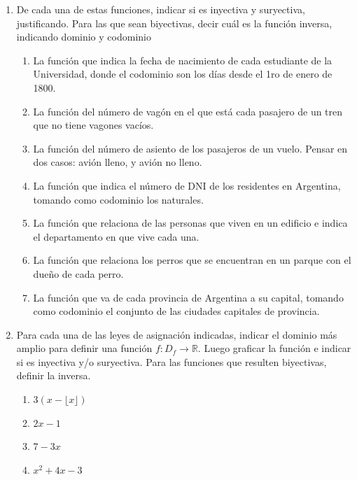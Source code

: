 \documentclass[a4paper]{article}
\newcommand{\exercise}{\item}
\begin{document}
\begin{enumerate}
\begin{enumerate} [label=(\alph*)]
		\item $R = \{(a,b), (b,c), (b,d), (d,e), (e,a)\}$
		\item $R = \{(a,a), (b,a), (c,d), (d,a), (e,a)\}$
		\item $R = \{(a,c), (b,e), (c,a), (d,b), (e,d)\}$
	\end{enumerate}
	\exercise De cada una de estas funciones, indicar si es inyectiva y suryectiva, justificando. Para las que sean biyectivas, decir cuál es la función inversa, indicando dominio y codominio
	\begin{enumerate} [label=(\alph*)]
		\item La función que indica la fecha de nacimiento de cada estudiante de la Universidad, donde el codominio son los días desde el 1ro de enero de 1800.
		\item La función del número de vagón en el que está cada pasajero de un tren que no tiene vagones vacíos.
		\item La función del número de asiento de los pasajeros de un vuelo. Pensar en dos casos: avión lleno, y avión no lleno.
		\item La función que indica el número de DNI de los residentes en Argentina, tomando como codominio los naturales.
		\item La función que relaciona de las personas que viven en un edificio e indica el
		departamento en que vive cada una.
		\item La función que relaciona los perros que se encuentran en un parque con el dueño de cada perro.
		\item La función que va de cada provincia de Argentina a su capital, tomando como
		codominio el conjunto de las ciudades capitales de provincia.
	\end{enumerate}
	\exercise Para cada una de las leyes de asignación indicadas, indicar el dominio más amplio para definir una función $f: D_{f} \to \mathbb{R}$. Luego graficar la función e indicar si es inyectiva y/o suryectiva. Para las funciones que resulten biyectivas, definir la inversa.
	\begin{enumerate} [label=(\alph*)]
		\item $3(x-\lfloor x \rfloor)$
		\item $2x-1$
		\item $7-3x$
		\item $x^2+4x-3$

\end{enumerate}
\end{enumerate}
\end{document}
